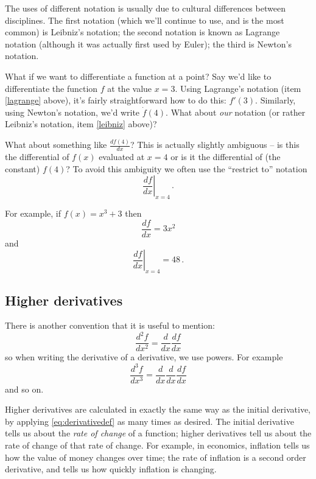 \documentclass[12pt]{article}
\begin{document}
The uses of different notation is usually due to cultural differences between disciplines. The first notation (which we'll continue to use, and is the most common) is Leibniz's notation; the second notation is known as Lagrange notation (although it was actually first used by Euler); the third is Newton's notation. 

What if we want to differentiate a function at a point? Say we'd like to differentiate the function $f$ at the value $x=3$. Using Lagrange's notation (item \ref{lagrange} above), it's fairly straightforward how to do this: $f'(3)$. Similarly, using Newton's notation, we'd write $\dot{f}(4)$. What about \emph{our} notation (or rather Leibniz's notation, item \ref{leibniz} above)?

What about something like $\frac{df(4)}{dx}$? This is actually slightly ambiguous -- is this the differential of $f(x)$ evaluated at $x=4$ or is it the
differential of (the constant) $f(4)$? To avoid this ambiguity we often use the ``restrict to'' notation
\begin{equation}
  \left.\frac{df}{dx}\right|_{x=4}\,.
\end{equation}

For example, if $f(x)=x^3+3$ then
\begin{equation}
  \frac{df}{dx}=3x^2
\end{equation}
and
\begin{equation*}
  \left.\frac{df}{dx}\right|_{x=4} = 48\,.
\end{equation*}
\subsection*{Higher derivatives}
There is another convention that it is useful to mention:
\begin{equation}
  \frac{d^2f}{dx^2}=\frac{d}{dx}\frac{df}{dx}
\end{equation}
so when writing the derivative of a derivative, we use powers.
For example
\begin{equation}
  \frac{d^3f}{dx^3}=\frac{d}{dx}\frac{d}{dx}\frac{df}{dx}
\end{equation}
and so on.

Higher derivatives are calculated in exactly the same way as the initial derivative, by applying \eqref{eq:derivativedef} as many times as desired. The initial derivative tells us about the \emph{rate of change} of a function; higher derivatives tell us about the rate of change of that rate of change. For example, in economics, inflation tells us how the value of money changes over time; the rate of inflation is a second order derivative, and tells us how quickly inflation is changing. 
\end{document}
